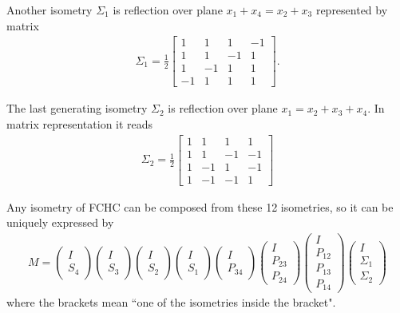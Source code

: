 Another isometry $\Sigma_1$ is reflection over plane $x_1 + x_4 = x_2 + x_3$ represented by matrix
\begin{align}
\Sigma_1 = \frac{1}{2}
\left[\begin{array}{rrrr}
1 & 1 & 1 & -1 \\
1 & 1 & -1 & 1 \\
1 & -1 & 1 & 1 \\
-1 & 1 & 1 & 1
\end{array}\right].
\end{align}

The last generating isometry $\Sigma_2$ is reflection over plane $x_1 = x_2 + x_3 + x_4$.
In matrix representation it reads
\begin{align}
\Sigma_2 = \frac{1}{2}
\left[\begin{array}{rrrr}
1 & 1 & 1 & 1 \\
1 & 1 & -1 & -1 \\
1 & -1 & 1 & -1 \\
1 & -1 & -1 & 1
\end{array}\right]
\end{align}

Any isometry of FCHC can be composed from these 12 isometries,
so it can be uniquely expressed by
\begin{align}
M = 
\begin{pmatrix}
I\\
S_4
\end{pmatrix}
\begin{pmatrix}
I\\
S_3
\end{pmatrix}
\begin{pmatrix}
I\\
S_2
\end{pmatrix}
\begin{pmatrix}
I\\
S_1
\end{pmatrix}
\begin{pmatrix}
I\\
P_{34}
\end{pmatrix}
\begin{pmatrix}
I\\
P_{23}\\
P_{24}
\end{pmatrix}
\begin{pmatrix}
I\\
P_{12}\\
P_{13}\\
P_{14}
\end{pmatrix}
\begin{pmatrix}
I\\
\Sigma_1\\
\Sigma_2
\end{pmatrix}
\end{align} 
where the brackets mean ``one of the isometries inside the bracket".


